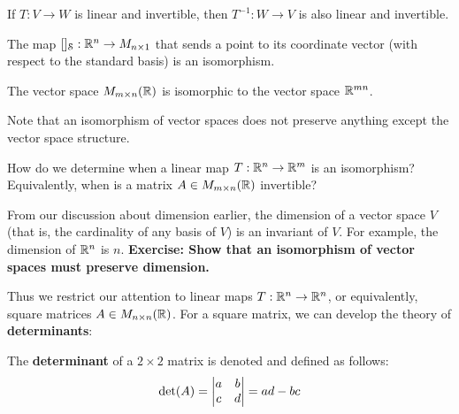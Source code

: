\begin{proposition}
    If $T : V \to W$ is linear and invertible, then $T^{-1} : W \to V$ is also linear and invertible.
    \end{proposition}

\begin{example}
    The map $[]_\mathcal{S} : \mathbb{R}^n \to M_{n \times 1}$ that sends a point to its coordinate vector (with respect to the standard basis) is an isomorphism.
    \end{example}

\begin{example}
    The vector space $M_{m \times n}(\mathbb{R})$ is isomorphic to the vector space $\mathbb{R}^{mn}$.

    
    \end{example}

Note that an isomorphism of vector spaces does not preserve anything except the vector space structure.








\begin{motivating}
How do we determine when a linear map $T : \mathbb{R}^n \to \mathbb{R}^m$ is an isomorphism?  Equivalently, when is a matrix $A \in M_{m \times n}(\mathbb{R})$ invertible?
\end{motivating}

From our discussion about dimension earlier,  the dimension of a vector space $V$ (that is, the cardinality of any basis of $V$) is an invariant of $V$.  For example, the dimension of $\mathbb{R}^n$ is $n$.  \textbf{Exercise: Show that an isomorphism of vector spaces must preserve dimension.}  

Thus we restrict our attention to linear maps $T : \mathbb{R}^n \to \mathbb{R}^n$, or equivalently, square matrices $A \in M_{n \times n}(\mathbb{R})$.  For a square matrix, we can develop the theory of \textbf{determinants}:

\begin{definition}
    The \textbf{determinant} of a $2 \times 2$ matrix is denoted and defined as follows:
\begin{equation*}
\textnormal{det}(A) = 
\begin{vmatrix}
a & b \\
c & d
\end{vmatrix} = ad-bc
\end{equation*}

    \end{definition}

